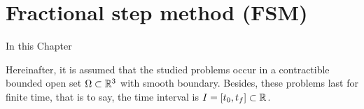 
\chapter{Fractional step method (FSM)}

In this Chapter

Hereinafter, it is assumed that the studied problems occur in a contractible bounded open set $\Omega \subset \mathbb{R}^3$ with smooth boundary. Besides, these problems last for finite time, that is to say, the time interval is $I = [t_0, t_f] \subset \mathbb{R}$.




% 

